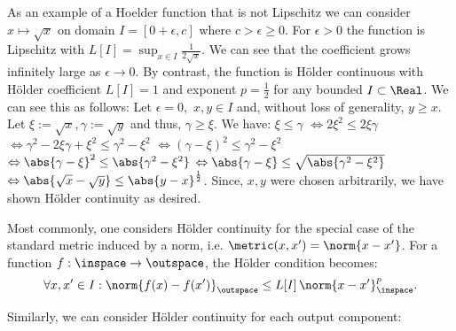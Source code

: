 \begin{ex}\label{ex:sqrtfctHoelder}
As an example of a Hoelder function that is not Lipschitz we can consider $x \mapsto \sqrt x$ on domain $I = [0+\epsilon,c]$ where 
$c >\epsilon \geq 0 $. For $\epsilon >0 $ the function is Lipschitz with $L[I] = \sup_{x \in I} \frac{1} {2 \sqrt{x}}$. We can see that the 
coefficient grows infinitely large as $\epsilon \to 0$. By contrast, the function is H\"older continuous 
with H\"older coefficient $L[I]=1$ and exponent $p=\frac 1 2 $ for any bounded $I \subset \Real$.
We can see this as follows: Let $\epsilon =0,$ $x,y \in I$ and, without loss of generality,  $y \geq x$. Let $\xi := \sqrt{x}, \gamma := \sqrt{y}$ and thus, $\gamma \geq \xi$. We have:
$\xi \leq \gamma $ $\Leftrightarrow 2 \xi^2 \leq 2\xi\gamma$ $\Leftrightarrow \gamma^2 - 2 \xi\gamma + \xi^2  \leq \gamma^2 - \xi^2$ $\Leftrightarrow (\gamma-\xi)^2  \leq \gamma^2-\xi^2$ $\Leftrightarrow \abs{\gamma-\xi}^2  \leq \abs{\gamma^2-\xi^2}$
 $\Leftrightarrow \abs{\gamma-\xi}  \leq \sqrt{\abs{\gamma^2-\xi^2}}$  $\Leftrightarrow \abs{\sqrt{x}-\sqrt{y}}  \leq \abs{y-x}^{\frac{1}{2}}$. Since, $x,y$ were chosen arbitrarily, we have shown H\"older continuity as desired.
\end{ex}
 
Most commonly, one considers H\"older continuity for the special case of the standard metric induced by a norm, i.e.  $\metric(x,x') = \norm{x-x'}$.
For a function $f: \inspace \to \outspace$, the H\"older condition becomes:
 \[\forall x,x' \in I : \norm{f(x)-f(x')}_\outspace \leq L[I] \, \norm{x-x'}_\inspace^p. \]

Similarly, we can consider H\"older continuity for each output component: 

